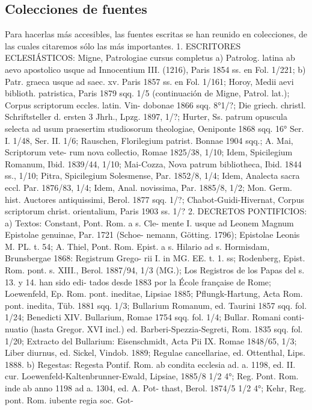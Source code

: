\raggedbottom{} \documentclass[12pt]{book}
\begin{document}
\subsection{Colecciones de fuentes} Para hacerlas más accesibles, las fuentes escritas se han reunido en
colecciones, de las cuales citaremos sólo las más importantes.
1. ESCRITORES ECLESIÁSTICOS: Migne, Patrologiae cursus completus
a) Patrolog. latina ab aevo apostolico usque ad Innocentium III. (1216),
Paris 1854 ss. en Fol. 1/221; b) Patr. graeca usque ad saec. xv. Paris 1857
ss. en Fol. 1/161; Horoy, Medii aevi biblioth. patristica, Paris 1879 sqq. 1/5
(continuación de Migne, Patrol. lat.); Corpus scriptorum eccles. latin. Vin-
dobonae 1866 sqq. 8°1/?; Die griech. christl. Schriftsteller d. ersten 3 Jhrh.,
Lpzg. 1897, 1/?; Hurter, Ss. patrum opuscula selecta ad usum praesertim
studiosorum theologiae, Oeniponte 1868 sqq. 16° Ser. I. 1/48, Ser. II. 1/6;
Rauschen, Florilegium patrist. Bonnae 1904 sqq.; A. Mai, Scriptorum vete-
rum nova collectio, Romae 1825/38, 1/10; Idem, Spicilegium Romanum, Ibid.
1839/44, 1/10; Mai-Cozza, Nova patrum bibliotheca, Ibid. 1844 ss., 1/10;
Pitra, Spicilegium Solesmense, Par. 1852/8, 1/4; Idem, Analecta sacra eccl.
Par. 1876/83, 1/4; Idem, Anal. novissima, Par. 1885/8, 1/2; Mon. Germ. hist.
Auctores antiquissimi, Berol. 1877 sqq. 1/?; Chabot-Guidi-Hivernat, Corpus
scriptorum christ. orientalium, Paris 1903 ss. 1/?
2. DECRETOS PONTIFICIOS: a) Textos: Constant, Pont. Rom. a s. Cle-
mente I. usque ad Leonem Magnum Epistolae genuinae, Par. 1721 (Schoe-
nemann, Götting. 1796); Epistolae Leonis M. PL. t. 54; A. Thiel, Pont. Rom.
Epist. a s. Hilario ad s. Hormisdam, Brunsbergae 1868: Registrum Grego-
rii I. in MG. EE. t. 1. ss; Rodenberg, Epist. Rom. pont. s. XIII., Berol.
1887/94, 1/3 (MG.); Los Registros de los Papas del s. 13. y 14. han sido edi-
tados desde 1883 por la École française de Rome; Loewenfeld, Ep. Rom.
pont. ineditae, Lipsiae 1885; Pflungk-Hartung, Acta Rom. pont. inedita,
Tüb. 1881 sqq. 1/3; Bullarium Romanum, ed. Taurini 1857 sqq. fol. 1/24;
Benedicti XIV. Bullarium, Romae 1754 sqq. fol. 1/4; Bullar. Romani conti-
nuatio (hasta Gregor. XVI incl.) ed. Barberi-Spezzia-Segreti, Rom. 1835
sqq. fol. 1/20; Extracto del Bullarium: Eisenschmidt, Acta Pii IX. Romae
1848/65, 1/3; Liber diurnus, ed. Sickel, Vindob. 1889; Regulae cancellariae,
ed. Ottenthal, Lips. 1888. b) Regestas: Regesta Pontif. Rom. ab condita
ecclesia ad. a. 1198, ed. II. cur. Loewenfeld-Kaltenbrunner-Ewald, Lipsiae,
1885/8 1/2 4°; Reg. Pont. Rom. inde ab anno 1198 ad a. 1304, ed. A. Pot-
thast, Berol. 1874/5 1/2 4°; Kehr, Reg. pont. Rom. iubente regia soc. Got-
\end{document}

